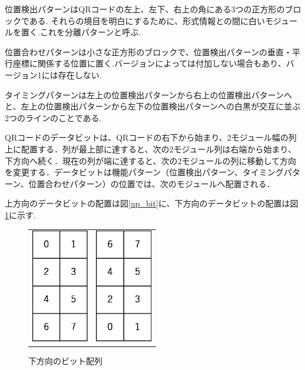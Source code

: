 \documentclass{thesis}
\begin{document}
位置検出パターンはQRコードの左上、左下、右上の角にある3つの正方形のブロックである.
それらの境目を明白にするために、形式情報との間に白いモジュールを置く.これを分離パターンと呼ぶ.

位置合わせパターンは小さな正方形のブロックで、位置検出パターンの垂直・平行座標に関係する位置に置く.バージョンによっては付加しない場合もあり、バージョン1には存在しない.

タイミングパターンは左上の位置検出パターンから右上の位置検出パターンへと、左上の位置検出パターンから左下の位置検出パターンへの白黒が交互に並ぶ$2$つのラインのことである.

QRコードのデータビットは、QRコードの右下から始まり、2モジュール幅の列上に配置する．列が最上部に達すると、次の2モジュール列は右端から始まり、下方向へ続く．現在の列が端に達すると、次の2モジュールの列に移動して方向を変更する．データビットは機能パターン（位置検出パターン、タイミングパターン、位置合わせパターン）の位置では、次のモジュールへ配置される．

上方向のデータビットの配置は図\ref{up_bit}に、下方向のデータビットの配置は図\ref{down_bit}に示す.

\begin{figure}[H]
  \begin{tabular}{cc}
    \begin{minipage}[t]{0.45\hsize}
      \centering
      \includegraphics[width=2.5cm,clip]{pic/up_bit.eps}%
      \caption{上方向のビット配列}
      \label{up_bit}
    \end{minipage} &
    \begin{minipage}[t]{0.45\hsize}
    \centering
      \includegraphics[width=2.5cm,clip]{pic/down_bit.eps}
       \caption{下方向のビット配列}
      \label{down_bit}
      \end{minipage}
  \end{tabular}
\end{figure}
\end{document}
